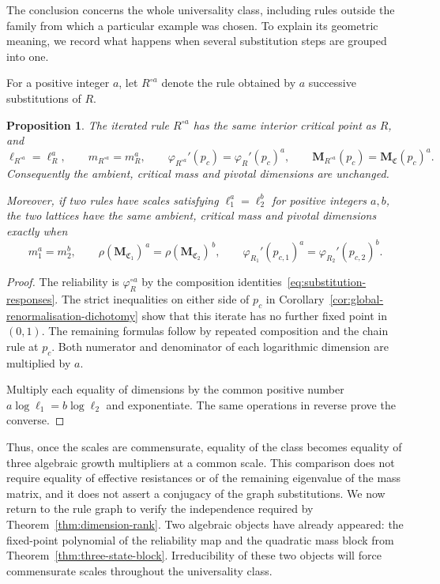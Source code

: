 \documentclass[scheme=plain,11pt]{ctexart}
\newtheorem{proposition}[theorem]{Proposition}
\theoremstyle{definition}
\theoremstyle{remark}
\begin{document}
The conclusion concerns the whole universality class, including rules outside the family from which a particular example was chosen.
To explain its geometric meaning, we record what happens when several substitution steps are grouped into one.

For a positive integer $a$, let $R^{\circ a}$ denote the rule obtained by $a$ successive substitutions of $R$.
\begin{proposition}\label{prop:iterated-response}\label{lem:aligned-class}
The iterated rule $R^{\circ a}$ has the same interior critical point as $R$, and
\[
 \ell_{R^{\circ a}}=\ell_R^a,\qquad m_{R^{\circ a}}=m_R^a,\qquad
 \varphi_{R^{\circ a}}'(p_c)=\varphi_R'(p_c)^a,\qquad
 \mathbf M_{R^{\circ a}}(p_c)=\mathbf M_{\mathfrak C}(p_c)^a.
\]
Consequently the ambient, critical mass and pivotal dimensions are unchanged.

Moreover, if two rules have scales satisfying $\ell_1^a=\ell_2^b$ for positive integers $a,b$, the two lattices have the same ambient, critical mass and pivotal dimensions exactly when
\[
 m_1^a=m_2^b,\qquad
 \rho(\mathbf M_{\mathfrak C_1})^{\,a}=\rho(\mathbf M_{\mathfrak C_2})^{\,b},\qquad
 \varphi_{R_1}'(p_{c,1})^a=\varphi_{R_2}'(p_{c,2})^b.
\]
\end{proposition}
\begin{proof}
The reliability is $\varphi_R^{\circ a}$ by the composition identities~\eqref{eq:substitution-responses}.
The strict inequalities on either side of $p_c$ in Corollary~\ref{cor:global-renormalisation-dichotomy} show that this iterate has no further fixed point in $(0,1)$.
The remaining formulas follow by repeated composition and the chain rule at $p_c$.
Both numerator and denominator of each logarithmic dimension are multiplied by $a$.

Multiply each equality of dimensions by the common positive number $a\log\ell_1=b\log\ell_2$ and exponentiate.
The same operations in reverse prove the converse.
\end{proof}



Thus, once the scales are commensurate, equality of the class becomes equality of three algebraic growth multipliers at a common scale.
This comparison does not require equality of effective resistances or of the remaining eigenvalue of the mass matrix, and it does not assert a conjugacy of the graph substitutions.
We now return to the rule graph to verify the independence required by Theorem~\ref{thm:dimension-rank}.
Two algebraic objects have already appeared: the fixed-point polynomial of the reliability map and the quadratic mass block from Theorem~\ref{thm:three-state-block}.
Irreducibility of these two objects will force commensurate scales throughout the universality class.
\end{document}
